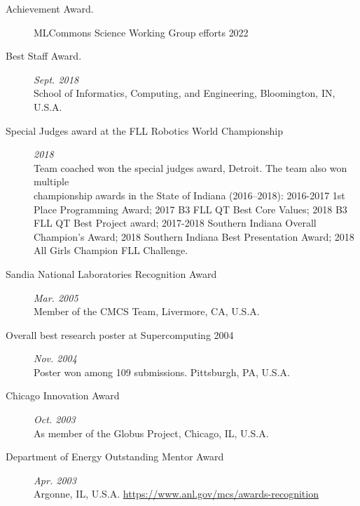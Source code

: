 \documentclass{article}
\begin{document}
\begin{description}
  \item[Achievement Award.] MLCommons Science Working Group efforts
    \hfill {2022}
\item[Best Staff Award.] \hfill {\it Sept. 2018} ~\\
  School of Informatics, Computing, and Engineering, Bloomington, IN, U.S.A. 

\item [Special Judges award at the FLL Robotics World Championship] \hfill{\it 2018} ~\\
  Team coached won the special judges award,
  Detroit. The team also won multiple \\
  championship awards in the State of Indiana (2016--2018):
  2016-2017 1st Place Programming Award;
  2017 B3 FLL QT Best Core Values;
  2018 B3 FLL QT Best Project award;  
  2017-2018 Southern Indiana Overall Champion’s Award;
  2018 Southern Indiana Best Presentation Award;
  2018 All Girls Champion FLL Challenge.

  
\item[Sandia National Laboratories Recognition Award]  \hfill {\it Mar. 2005} ~\\
  Member of the CMCS Team, Livermore, CA, U.S.A.
  
\item[Overall best research poster at Supercomputing 2004] \hfill {\it Nov. 2004} ~\\
  Poster won among 109 submissions. Pittsburgh, PA, U.S.A. 
  
\item[Chicago Innovation Award] \hfill {\it Oct. 2003} ~\\
  As member of the Globus Project, Chicago, IL, U.S.A.
  
\item[Department of Energy Outstanding Mentor Award] \hfill {\it Apr. 2003} ~\\
  Argonne, IL, U.S.A. \url{https://www.anl.gov/mcs/awards-recognition}

  
  

\end{description}
\end{document}
